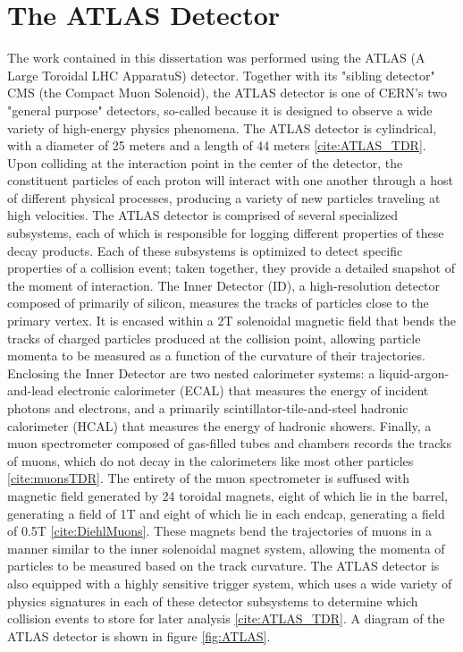 \section{The ATLAS Detector} \label{sec:ATLAS} 

The work contained in this dissertation was performed using the ATLAS (A Large Toroidal LHC ApparatuS) detector. Together with its "sibling detector" CMS (the Compact Muon Solenoid), the ATLAS detector is one of CERN's two "general purpose" detectors, so-called because it is designed to observe a wide variety of high-energy physics phenomena. The ATLAS detector is cylindrical, with a diameter of 25 meters and a length of 44 meters \ref{cite:ATLAS_TDR}. Upon colliding at the interaction point in the center of the detector, the constituent particles of each proton will interact with one another through a host of different physical processes, producing a variety of new particles traveling at high velocities. The ATLAS detector is comprised of several specialized subsystems, each of which is responsible for logging different properties of these decay products. Each of these subsystems is optimized to detect specific properties of a collision event; taken together, they provide a detailed snapshot of the moment of interaction.
	The Inner Detector (ID), a high-resolution detector composed of primarily of silicon, measures the tracks of particles close to the primary vertex. It is encased within a 2T solenoidal magnetic field that bends the tracks of charged particles produced at the collision point, allowing particle momenta to be measured as a function of the curvature of their trajectories. Enclosing the Inner Detector are two nested calorimeter systems: a liquid-argon-and-lead electronic calorimeter (ECAL) that measures the energy of incident photons and electrons, and a primarily scintillator-tile-and-steel hadronic calorimeter (HCAL) that measures the energy of hadronic showers. Finally, a muon spectrometer composed of gas-filled tubes and chambers records the tracks of muons, which do not decay in the calorimeters like most other particles \ref{cite:muonsTDR}.
	The entirety of the muon spectrometer is suffused with magnetic field generated by 24 toroidal magnets, eight of which lie in the barrel, generating a field of 1T and eight of which lie in each endcap, generating a field of 0.5T \ref{cite:DiehlMuons}. These magnets bend the trajectories of muons in a manner similar to the inner solenoidal magnet system, allowing the momenta of particles to be measured based on the track curvature. The ATLAS detector is also equipped with a highly sensitive trigger system, which uses a wide variety of physics signatures in each of these detector subsystems to determine which collision events to store for later analysis \ref{cite:ATLAS_TDR}. A diagram of the ATLAS detector is shown in figure \ref{fig:ATLAS}.

